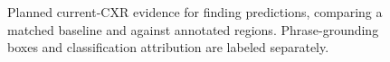 \begin{figure}[tbp]
    \centering
    \caption{Planned current-CXR evidence for finding predictions, comparing a matched baseline and \method{} against annotated regions. Phrase-grounding boxes and classification attribution are labeled separately.}
    \label{fig:candidate_clinical_evidence}
\end{figure}
